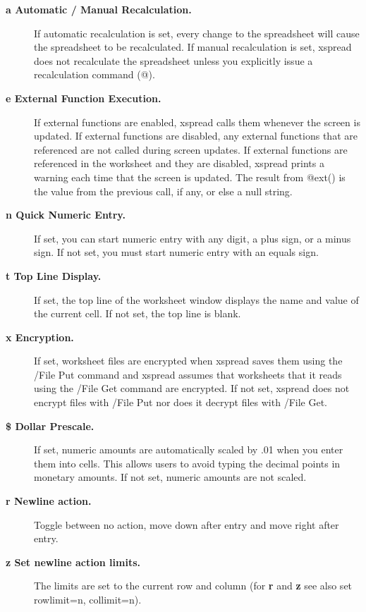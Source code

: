 \begin{description}
\item[{\bf a   Automatic / Manual Recalculation.}]{If automatic recalculation is set,
every change to the spreadsheet will cause the spreadsheet to be 
recalculated.  If manual recalculation is set, xspread does not 
recalculate the spreadsheet unless you explicitly issue a recalculation command
(@).}


\item[{\bf e   External Function Execution.}]{If external functions are enabled,
xspread calls them whenever the screen is updated.  If external 
functions are disabled, any external functions that are referenced are 
not called during screen updates.  If external functions are 
referenced in the worksheet and they are disabled, xspread prints a 
warning each time that the screen is updated.  The result from @ext() 
is the value from the previous call, if any, or else a null string.}

\item[{\bf n   Quick Numeric Entry.}]{  If set, you can start numeric entry with any
digit, a plus sign, or a minus sign.  If not set, you must start 
numeric entry with an equals sign.}

\item[{\bf t   Top Line Display.}]{  If set, the top line of the worksheet window
displays the name and value of the current cell.  If not set, the top 
line is blank.}

\item[{\bf  x   Encryption.}]{  If set, worksheet files are encrypted when xspread saves
them using the /File Put command and xspread assumes that worksheets 
that it reads using the /File Get command are encrypted.  If not set, 
xspread does not encrypt files with /File Put nor does it decrypt 
files with /File Get.}

\item[{\bf \$   Dollar Prescale.}]{  If set, numeric amounts are automatically scaled by
.01 when you enter them into cells.  This allows users to avoid typing 
the decimal points in monetary amounts.  If not set, numeric amounts 
are not scaled.}

\item[{\bf r   Newline action.}]{  Toggle between no action, move down
after entry and move right after entry.}

\item[{\bf z   Set newline action limits.}]{  The limits are set to the
current row and column (for {\bf r} and {\bf z} see also set rowlimit=n,
collimit=n).}
\end{description}

